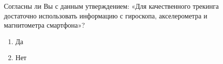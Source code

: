 
Согласны ли Вы с данным утверждением: «Для качественного трекинга достаточно использовать информацию с гироскопа, акселерометра и магнитометра смартфона»?

\begin{enumerate}
    \item Да
    \item Нет
\end{enumerate}
